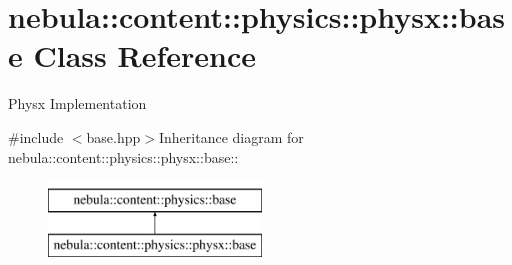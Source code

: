 \hypertarget{classnebula_1_1content_1_1physics_1_1physx_1_1base}{
\section{nebula::content::physics::physx::base Class Reference}
\label{classnebula_1_1content_1_1physics_1_1physx_1_1base}
}


Physx Implementation  


{\ttfamily \#include $<$base.hpp$>$}Inheritance diagram for nebula::content::physics::physx::base::\begin{figure}[H]
\begin{center}
\leavevmode
\includegraphics[height=2cm]{classnebula_1_1content_1_1physics_1_1physx_1_1base}
\end{center}
\end{figure}
